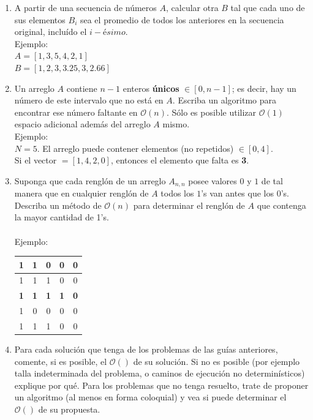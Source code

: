 \begin{enumerate}
\vspace{15mm}		
		
		
		\item A partir de una secuencia de números $A$, calcular otra $B$ tal que cada uno
		de sus elementos $B_i$ sea el promedio de todos los anteriores en la secuencia
		original, incluído el $i-ésimo$.\\
		Ejemplo:\\
		$A = [1, 3, 5, 4, 2, 1]$\\
		$B = [1, 2, 3, 3.25, 3, 2.66]$
		
		
		\item Un arreglo $A$ contiene $n-1$ enteros \textbf{únicos} $\in [0, n-1]$; es decir, 
		hay un número de este intervalo que no está en $A$. Escriba un algoritmo para encontrar
		ese número faltante en $\mathcal{O}(n)$. Sólo es posible utilizar $\mathcal{O}(1)$ espacio
		adicional además del arreglo $A$ mismo.\\
		Ejemplo:\\
		$N = 5$. El arreglo puede contener elementos (no repetidos) $\in [0, 4]$.\\
		Si el vector $=[1, 4, 2, 0]$, entonces el elemento que falta es \textbf{3}.
		

		\item Suponga que cada renglón de un arreglo $A_{n,n}$ posee valores $0$ y $1$ de tal
		manera que en cualquier renglón de $A$ todos los $1$'s van antes que los $0$'s. Describa
		un método de $\mathcal{O}(n)$ para determinar el renglón de $A$ que contenga la
		mayor cantidad de 1's.\\\\
		Ejemplo:
		\begin{flushleft}
  \begin{tabular}{|| c | c | c | c | c ||}
    \hline\hline
    1 & 1 & 0 & 0 & 0 \\ \hline
    1 & 1 & 1 & 0 & 0 \\ \hline
    \cellcolor{green!17}\textbf{1} & \cellcolor{green!17}\textbf{1} & \cellcolor{green!17}\textbf{1} & \cellcolor{green!17}\textbf{1} & \cellcolor{green!17}\textbf{0} \\ \hline
    1 & 0 & 0 & 0 & 0 \\ \hline
    1 & 1 & 1 & 0 & 0 \\ \hline
    \hline
  \end{tabular}
\end{flushleft}


	\item Para cada solución que tenga de los problemas de las guías anteriores, comente, si es posible, el $\mathcal{O}()$ de
	su solución. Si no es posible (por ejemplo talla indeterminada del problema, o caminos de ejecución no determinísticos) explique
	por qué. Para los problemas que no tenga resuelto, trate de proponer un algoritmo (al menos en forma coloquial) y vea
	si puede determinar el $\mathcal{O}()$ de su propuesta.
	

\end{enumerate}
